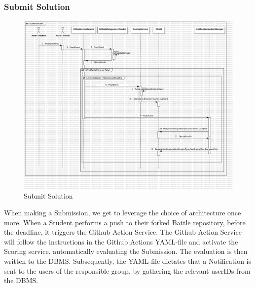 \subsubsection{Submit Solution}
\begin{figure}[H]
    \centering
    \includegraphics[width=\textwidth]{Graphics/Sequence Diagrams/SubmitSolution.png}
    \caption{Submit Solution}
    \label{fig:submitsolution}
\end{figure}
When making a Submission, we get to leverage the choice of architecture once more. When a Student performs a push to their forked Battle repository, before the deadline, it triggers the Github Action Service. The Github Action Service will follow the instructions in the Github Actions YAML-file and activate the Scoring service, automatically evaluating the Submission. The evaluation is then written to the DBMS. 
Subsequently, the YAML-file dictates that a Notification is sent to the users of the responsible group, by gathering the relevant userIDs from the DBMS.  

